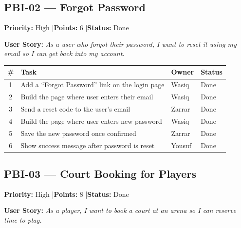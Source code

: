 \documentclass[12pt,a4paper]{article}
\begin{document}
\vspace{1.5em}

\subsection*{PBI-02 --- Forgot Password}
\textbf{Priority:} High \quad|\quad \textbf{Points:} 6 \quad|\quad \textbf{Status:} Done

\vspace{0.3em}
\textbf{User Story:} \textit{As a user who forgot their password, I want to reset it using my email so I can get back into my account.}

\vspace{0.5em}
\noindent\renewcommand{\arraystretch}{1.3}
\begin{tabularx}{\textwidth}{|c|X|l|l|}
\hline
\rowcolor{headerbg}\color{white}\bfseries \# & \color{white}\bfseries Task & \color{white}\bfseries Owner & \color{white}\bfseries Status \\ \hline
1 & Add a ``Forgot Password'' link on the login page & Wasiq & Done \\ \hline
\rowcolor{rowgray} 2 & Build the page where user enters their email & Wasiq & Done \\ \hline
3 & Send a reset code to the user's email & Zarrar & Done \\ \hline
\rowcolor{rowgray} 4 & Build the page where user enters new password & Wasiq & Done \\ \hline
5 & Save the new password once confirmed & Zarrar & Done \\ \hline
\rowcolor{rowgray} 6 & Show success message after password is reset & Yousuf & Done \\ \hline
\end{tabularx}

\vspace{1.5em}

\subsection*{PBI-03 --- Court Booking for Players}
\textbf{Priority:} High \quad|\quad \textbf{Points:} 8 \quad|\quad \textbf{Status:} Done

\vspace{0.3em}
\textbf{User Story:} \textit{As a player, I want to book a court at an arena so I can reserve time to play.}
\end{document}
